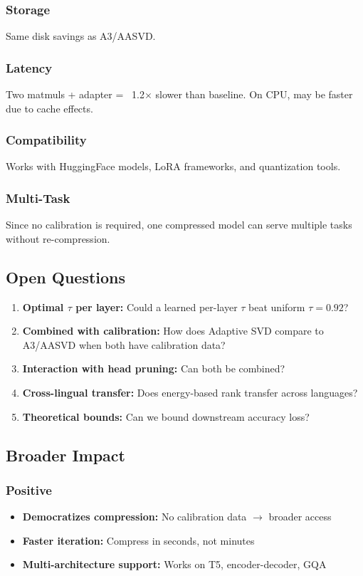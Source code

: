 \subsubsection{Storage}
Same disk savings as A3/AASVD.

\subsubsection{Latency}
Two matmuls + adapter = ~1.2$\times$ slower than baseline. On CPU, 
may be faster due to cache effects.

\subsubsection{Compatibility}
Works with HuggingFace models, LoRA frameworks, and quantization tools.

\subsubsection{Multi-Task}
Since no calibration is required, one compressed model can serve multiple 
tasks without re-compression.

\subsection{Open Questions}

\begin{enumerate}
\item \textbf{Optimal $\tau$ per layer:} Could a learned per-layer $\tau$ beat uniform
  $\tau = 0.92$?
\item \textbf{Combined with calibration:} How does Adaptive SVD compare to A3/AASVD
  when both have calibration data?
\item \textbf{Interaction with head pruning:} Can both be combined?
\item \textbf{Cross-lingual transfer:} Does energy-based rank transfer across languages?
\item \textbf{Theoretical bounds:} Can we bound downstream accuracy loss?

\end{enumerate}
\subsection{Broader Impact}

\subsubsection{Positive}
\begin{itemize}
\item \textbf{Democratizes compression:} No calibration data $\to$ broader access
\item \textbf{Faster iteration:} Compress in seconds, not minutes
\item \textbf{Multi-architecture support:} Works on T5, encoder-decoder, GQA

\end{itemize}
